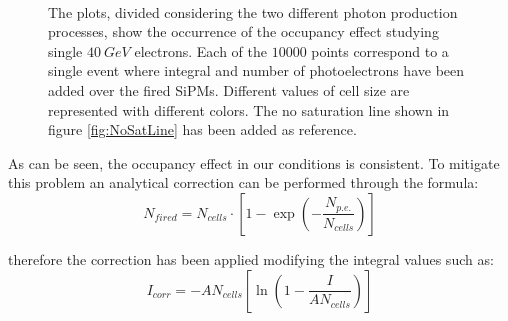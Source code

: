 \begin{figure}
	\centering
	\\
	\caption{The plots, divided considering the two different photon production processes, show the occurrence of the occupancy effect studying single $40\ GeV$ electrons. Each of the $10000$ points correspond to a single event where integral and number of photoelectrons have been added over the fired SiPMs. Different values of cell size are represented with different colors. The no saturation line shown in figure \ref{fig:NoSatLine} has been added as reference.}
	\label{fig:perc_sat}
\end{figure}

As can be seen, the occupancy effect in our conditions is consistent. To mitigate this problem an analytical correction can be performed through the formula:
\begin{equation}
	N_{fired}=N_{cells} \cdot \left[ 1 - \exp\left(-\frac{N_{p.e.}}{N_{cells}}\right)\right]
\end{equation}

therefore the correction has been applied modifying the integral values such as:
\begin{equation}
	I_{corr} = - A N_{cells} \left[ \ln\left(1 - \frac{I}{A N_{cells}}\right) \right]
\end{equation}

